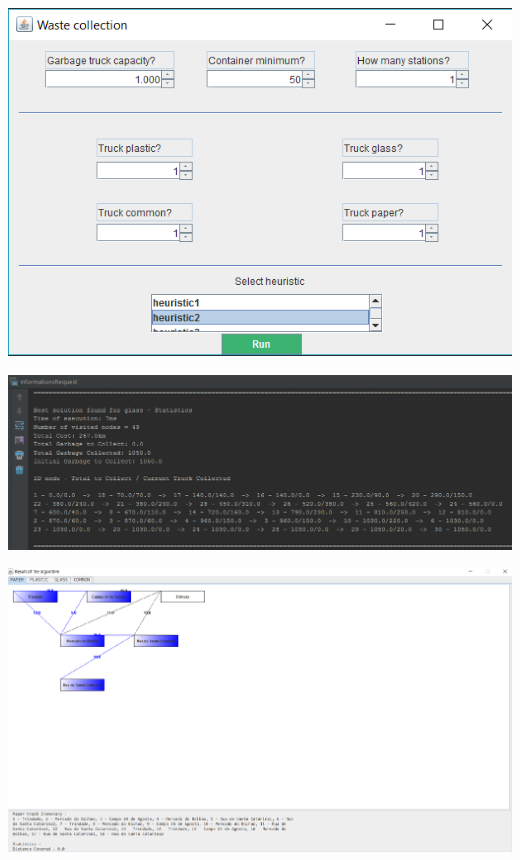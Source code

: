 \documentclass[a4paper]{article}
\begin{document}
\begin{center}
\centering \includegraphics[scale=0.75]{table3.png}
\end{center}
 
\begin{center}
	\includegraphics[scale=0.75]{console_statistics.png}
\end{center}

\begin{center}
	\includegraphics[scale=0.6]{result.png}
\end{center}
	
\end{document}
